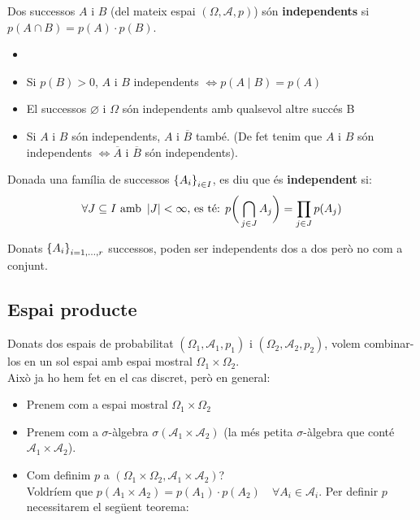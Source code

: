 \begin{defi}
  Dos successos $A$ i $B$ (del mateix espai $(\Omega, \mathcal{A}, p)$) són \textbf{independents} 
  si $p(A\cap B) = p(A)\cdot p(B)$.
\end{defi}

\begin{obs}
  \begin{itemize}
      \item []
      \item Si $p(B) > 0$, $A$ i $B$ independents $\iff p(A\mid B)=p(A)$
      \item El successos $\varnothing$ i $\Omega$ són independents amb qualsevol altre succés B
      \item Si $A$ i $B$ són independents, $A$ i $\overline{B}$ també. (De fet tenim que $A$ i $B$ 
      són independents $\iff \overline{A}$ i $\overline{B}$ són independents).
  \end{itemize}
\end{obs}

\begin{defi}
  Donada una família de successos $\left\{A_{i}\right\}_{i\in I}$, es diu que és \textbf{independent} si:
  \[
    \forall J \subseteq I \text{ amb } \left\vert J \right\vert < \infty \text{, es té: } p\bigg(\bigcap\limits_{j\in J}A_{j}\bigg)
    = \prod_{j\in J}p(A_{j}) 
  \]
\end{defi}

\begin{obs}
  Donats $\left\{A_{i}\right\}_{i = 1, \ldots, r}$ successos, poden ser independents dos a dos però no com a conjunt.
\end{obs}

\subsection{Espai producte}

Donats dos espais de probabilitat $(\Omega_{1}, \mathcal{A}_{1}, p_{1})$ i $(\Omega_{2}, 
\mathcal{A}_{2}, p_{2})$, volem combinar-los en un sol espai amb espai mostral $\Omega_{1}\times\Omega_{2}$. \\
Això ja ho hem fet en el cas discret, però en general:
\begin{itemize}
    \item Prenem com a espai mostral $\Omega_{1}\times\Omega_{2}$
    \item Prenem com a $\sigma$-àlgebra $\sigma(\mathcal{A}_{1}\times\mathcal{A}_{2})$ 
    (la més petita $\sigma$-àlgebra que conté $\mathcal{A}_{1}\times\mathcal{A}_{2}$).
    \item Com definim $p$ a $(\Omega_{1}\times\Omega_{2}, \mathcal{A}_{1}\times\mathcal{A}_{2})$? \\ 
    Voldríem que $p(A_{1}\times A_{2}) = p(A_{1})\cdot p(A_{2}) \quad \forall A_{i} \in \mathcal{A}_{i}$. 
    Per definir $p$ necessitarem el següent teorema:
\end{itemize}

